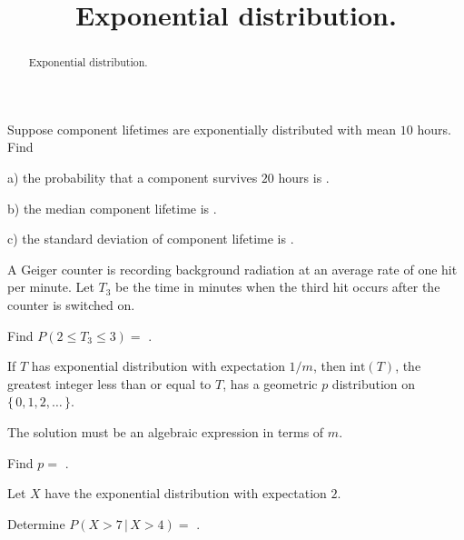 \documentclass{ximera}
\title{Exponential distribution.}
\begin{document}
\begin{abstract}
Exponential distribution.
\end{abstract}
\maketitle

Suppose component lifetimes are exponentially distributed with mean $10$ hours. Find

\begin{question} 
     \begin{solution}
          a) the probability that a component survives $20$ hours is  .
     \end{solution}
\end{question}

\begin{question} 
     \begin{solution}
          b) the median component lifetime is  .
     \end{solution}
\end{question}

\begin{question} 
     \begin{solution}
          c) the standard deviation of component lifetime is  .
     \end{solution}
\end{question}

A Geiger counter is recording background radiation at an average rate of one hit per minute. Let $T_{3}$ be the time in minutes when the third hit occurs after the counter is switched on.

\begin{question}
     \begin{solution}
          Find $P( 2 \leq T_{3} \leq 3 ) = $ .
     \end{solution}
\end{question} 

If $T$ has exponential distribution with expectation $1/m$, then $\text{int}(T)$, the greatest integer less than or equal to $T$, has a geometric $p$ distribution on $\{\, 0,1,2,\dots \,\}$.

 \begin{question}
     \begin{hint}
          The solution must be an algebraic expression in terms of $m$.
     \end{hint}
     \begin{solution}
          Find $p = $ .
     \end{solution}
\end{question}

Let $X$ have the exponential distribution with expectation $2$.

\begin{question}
     \begin{solution}
          Determine $P( X > 7 \,\vert\,  X > 4 ) = $ .
     \end{solution}
\end{question} 
\end{document}
